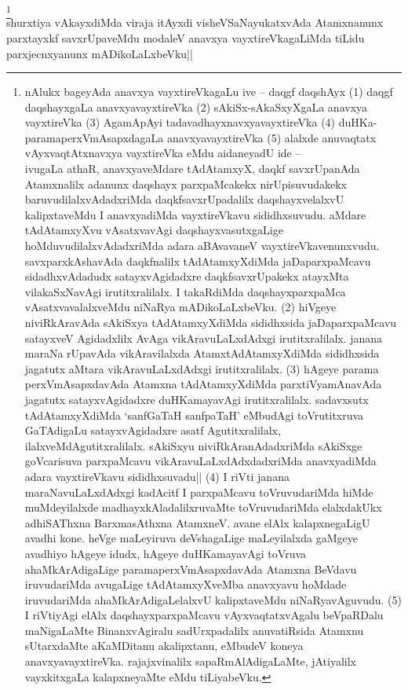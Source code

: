 \begin{artha} 
\footnote[1]{nAlukx bageyAda anavxya vayxtireVkagaLu ive -- daqgf 
daqshAyx (1) daqgf daqshayxgaLa anavxyavayxtireVka (2) 
sAkiSx-sAkaSxyXgaLa anavxya vayxtireVka (3) AgamApAyi 
tadavadhayxnavxyavayxtireVka (4) duHKa-paramaperxVmAsapxdagaLa 
anavxyavayxtireVka (5) alalxde anuvaqtatx vAyxvaqtAtxnavxya 
vayxtireVka eMdu aidaneyadU ide --\\ 
ivugaLa athaR, anavxyaveMdare tAdAtamxyX, daqkf savxrUpanAda 
Atamxnalilx adanunx daqshayx parxpaMcakekx nirUpisuvudakekx 
baruvudilalxvAdadxriMda daqkfsavxrUpadalilx daqshayxvelalxvU 
kalipxtaveMdu I anavxyadiMda vayxtireVkavu sididhxsuvudu. aMdare 
tAdAtamxyXvu vAsatxvavAgi daqshayxvasutxgaLige 
hoMduvudilalxvAdadxriMda adara aBAvavaneV vayxtireVkavenunxvudu. 
savxparxkAshavAda daqkfnalilx tAdAtamxyXdiMda jaDaparxpaMcavu 
sidadhxvAdadudx satayxvAgidadxre daqkfsavxrUpakekx atayxMta 
vilakaSxNavAgi irutitxralilalx. I takaRdiMda daqshayxparxpaMca 
vAsatxvavalalxveMdu niNaRya mADikoLaLxbeVku. (2) hiVgeye niviRkAravAda 
sAkiSxya tAdAtamxyXdiMda sididhxsida jaDaparxpaMcavu satayxveV 
Agidadxlilx AvAga vikAravuLaLxdAdxgi irutitxralilalx. janana maraNa 
rUpavAda vikAravilalxda AtamxtAdAtamxyXdiMda sididhxsida jagatutx 
aMtara vikAravuLaLxdAdxgi irutitxralilalx. (3) hAgeye parama 
perxVmAsapxdavAda Atamxna tAdAtamxyXdiMda parxtiVyamAnavAda jagatutx 
satayxvAgidadxre duHKamayavAgi irutitxralilalx. sadavxsutx 
tAdAtamxyXdiMda `sanfGaTaH sanfpaTaH' eMbudAgi toVrutitxruva 
GaTAdigaLu satayxvAgidadxre asatf Agutitxralilalx, 
ilalxveMdAgutitxralilalx. sAkiSxyu niviRkAranAdadxriMda sAkiSxge 
goVcarisuva parxpaMcavu vikAravuLaLxdAdxdadxriMda anavxyadiMda adara 
vayxtireVkavu sididhxsuvadu|| (4) I riVti janana maraNavuLaLxdAdxgi 
kadAcitf I parxpaMcavu toVruvudariMda hiMde muMdeyilalxde 
madhayxkAladalilxruvaMte toVruvudariMda elalxdakUkx adhiSAThxna 
BarxmasAthxna AtamxneV. avane elAlx kalapxnegaLigU avadhi kone. heVge 
maLeyiruva deVshagaLige maLeyilalxda gaMgeye avadhiyo hAgeye idudx, 
hAgeye duHKamayavAgi toVruva ahaMkArAdigaLige paramaperxVmAsapxdavAda 
Atamxna BeVdavu iruvudariMda avugaLige tAdAtamxyXveMba anavxyavu 
hoMdade iruvudariMda ahaMkArAdigaLelalxvU kalipxtaveMdu 
niNaRyavAguvudu. (5) I riVtiyAgi elAlx daqshayxparxpaMcavu 
vAyxvaqtatxvAgalu beVpaRDalu maNigaLaMte BinanxvAgiralu sadUrxpadalilx 
anuvatiRsida Atamxnu sUtarxdaMte aKaMDitanu akalipxtanu, eMbudeV 
koneya anavxyavayxtireVka. rajajxvinalilx sapaRmAlAdigaLaMte, 
jAtiyalilx vayxkitxgaLa kalapxneyaMte eMdu tiLiyabeVku.}\\
shurxtiya vAkayxdiMda viraja itAyxdi visheVSaNayukatxvAda Atamxnanunx 
parxtayxkf savxrUpaveMdu modaleV anavxya vayxtireVkagaLiMda tiLidu 
parxjecnxyanunx mADikoLaLxbeVku||
\end{artha}


